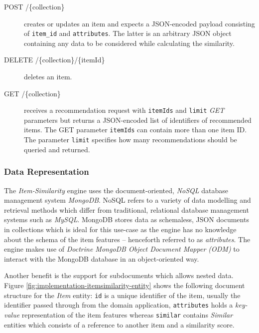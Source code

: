 \begin{description}
    \item[POST /\{collection\}] creates or updates an item and expects a JSON-encoded payload consisting of \texttt{item_id} and \texttt{attributes}. The latter is an arbitrary JSON object containing any data to be considered while calculating the similarity.
    \item[DELETE /\{collection\}/\{itemId\}] deletes an item.
    \item[GET /\{collection\}] receives a recommendation request with \texttt{itemIds} and \texttt{limit} \emph{GET} parameters but returns a JSON-encoded list of identifiers of recommended items. The GET parameter \texttt{itemIds} can contain more than one item ID. The parameter \texttt{limit} specifies how many recommendations should be queried and returned.
\end{description}

\subsubsection{Data Representation}

The \emph{Item-Similarity} engine uses the document-oriented, \emph{NoSQL} database management system \emph{MongoDB}. NoSQL refers to a variety of data modelling and retrieval methods which differ from traditional, relational database management systems such as \emph{MySQL}. MongoDB stores data as schemaless, JSON documents in collections which is ideal for this use-case as the engine has no knowledge about the schema of the item features -- henceforth referred to as \emph{attributes}. The engine makes use of \emph{Doctrine MongoDB Object Document Mapper (ODM)} to interact with the MongoDB database in an object-oriented way.

Another benefit is the support for subdocuments which allows nested data. Figure \ref{fig:implementation-itemsimilarity-entity} shows the following document structure for the \emph{Item} entity: \texttt{id} is a unique identifier of the item, usually the identifier passed through from the domain application, \texttt{attributes} holds a \emph{key-value} representation of the item features whereas \texttt{similar} contains \emph{Similar} entities which consists of a reference to another item and a similarity score.

